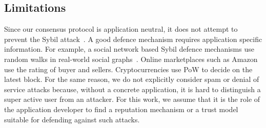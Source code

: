 \subsection*{Limitations}
Since our consensus protocol is application neutral, it does not attempt to prevent the Sybil attack~\cite{douceur2002sybil}.
A good defence mechanism requires application specific information.
For example, a social network based Sybil defence mechanisms use random walks in real-world social graphs~\cite{yu2006sybilguard}.
Online marketplaces such as Amazon use the rating of buyer and sellers.
Cryptocurrencies use PoW to decide on the latest block.
For the same reason, we do not explicitly consider spam or denial of service attacks because,
without a concrete application,
it is hard to distinguish a super active user from an attacker.
For this work,
we assume that it is the role of the application developer to find a reputation mechanism or a trust model suitable for defending against such attacks.



